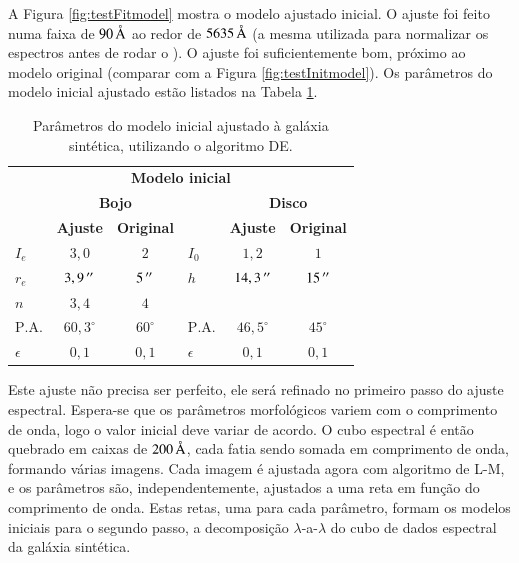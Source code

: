 A Figura \ref{fig:testFitmodel} mostra o modelo ajustado inicial. O ajuste
foi feito numa faixa de $90\,\text{\normalfont\AA}$ ao redor de $5635\,\text{\normalfont\AA}$ (a
mesma utilizada para normalizar os espectros antes de rodar o \starlight).
O ajuste foi suficientemente bom, próximo ao modelo original (comparar com a
Figura \ref{fig:testInitmodel}). Os parâmetros do modelo inicial ajustado estão
listados na Tabela \ref{tab:testeModeloInicial}.

\begin{table}
\begin{tabular}{ l c c l c c }
  \hline
  \multicolumn{6}{c}{\textbf{Modelo inicial}} \\
  & \multicolumn{2}{c}{\textbf{Bojo}} & & \multicolumn{2}{c}{\textbf{Disco}} \\
  & \textbf{Ajuste} & \textbf{Original} & & \textbf{Ajuste} & \textbf{Original} \\
  \hline
  $I_e$ & $3,0$ & $2$ & $I_0$ & $1,2$ & $1$ \\
  $r_e$ & $3,9\,^{\prime\prime}$ & $5\,^{\prime\prime}$ & $h$ & $14,3\,^{\prime\prime}$ & $15\,^{\prime\prime}$\\
  $n$ & $3,4$ & $4$ & & & \\
  $\mathrm{P.A.}$ & $60,3^\circ$ & $60^\circ$ & $\mathrm{P.A.}$ & $46,5^\circ$ &
  $45^\circ$ \\
  $\epsilon$ & $0,1$ & $0,1$ & $\epsilon$ & $0,1$ & $0,1$ \\
  \hline
\end{tabular}
\caption[Modelo inicial ajustado à galáxia sintética]
{Parâmetros do modelo inicial ajustado à galáxia sintética, utilizando o
algoritmo DE.}
\label{tab:testeModeloInicial}
\end{table}


Este ajuste não precisa ser perfeito, ele será refinado no primeiro passo do
ajuste espectral. Espera-se que os  parâmetros morfológicos variem com o
comprimento de onda, logo o valor inicial deve variar de acordo. O cubo
espectral é então quebrado em caixas de $200\,\text{\normalfont\AA}$, cada fatia sendo
somada em comprimento de onda, formando várias imagens. Cada imagem é ajustada
agora com algoritmo de L-M, e os parâmetros são, independentemente, ajustados a
uma reta em função do comprimento de onda. Estas retas, uma para cada parâmetro,
formam os modelos iniciais para o segundo passo, a decomposição
$\lambda$-a-$\lambda$ do cubo de dados espectral da galáxia sintética.

